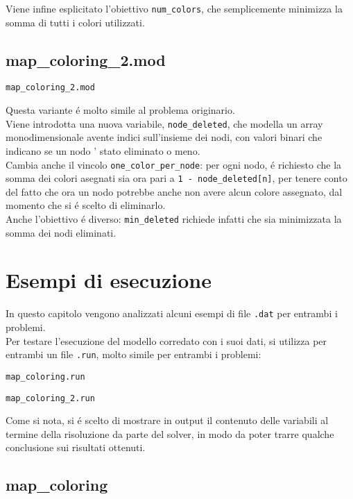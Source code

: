 \documentclass{article}
\begin{document}
Viene infine esplicitato l'obiettivo \texttt{num\_colors}, che semplicemente minimizza la somma di tutti i colori utilizzati.\\
\pagebreak

\subsection{map\_coloring\_2.mod}
\texttt{map\_coloring\_2.mod}


Questa variante \'e molto simile al problema originario.\\
Viene introdotta una nuova variabile, \texttt{node\_deleted}, che modella un array monodimensionale avente indici sull'insieme dei nodi, con valori binari che indicano se un nodo \e' stato eliminato o meno.\\

Cambia anche il vincolo \texttt{one\_color\_per\_node}: per ogni nodo, \'e richiesto che la somma dei colori asegnati sia ora pari a \texttt{1 - node\_deleted[n]}, per tenere conto del fatto che ora un nodo potrebbe anche non avere alcun colore assegnato, dal momento che si \'e scelto di eliminarlo.\\

Anche l'obiettivo \'e diverso: \texttt{min\_deleted} richiede infatti che sia minimizzata la somma dei nodi eliminati.\\
\pagebreak

\section{Esempi di esecuzione}
In questo capitolo vengono analizzati alcuni esempi di file \texttt{.dat} per entrambi i problemi.\\
Per testare l'esecuzione del modello corredato con i suoi dati, si utilizza per entrambi un file \texttt{.run}, molto simile per entrambi i problemi:

\texttt{map\_coloring.run}


\texttt{map\_coloring\_2.run}


Come si nota, si \'e scelto di mostrare in output il contenuto delle variabili al termine della risoluzione da parte del solver, in modo da poter trarre qualche conclusione sui risultati ottenuti.\\

\subsection{map\_coloring}
\end{document}
